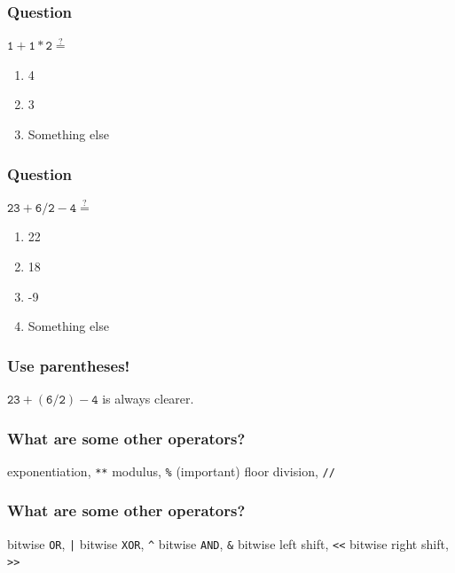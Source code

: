 \documentclass[11pt]{beamer}
\begin{document}
\begin{frame}
  \frametitle{Question}
  \Enlarge

  $\mathtt{1 + 1 * 2} \overset{?}{=}$
  \begin{enumerate}[label=\Alph*]
  \item  4
  \item  3
  \item  Something else
  \end{enumerate}
\end{frame}

\begin{frame}
  \frametitle{Question}
  \Enlarge

  $\mathtt{23 + 6 / 2 - 4} \overset{?}{=}$
  \begin{enumerate}[label=\Alph*]
  \item  22
  \item  18
  \item  -9
  \item  Something else
  \end{enumerate}
\end{frame}

\begin{frame}
  \frametitle{Use parentheses!}
  \Enlarge

  $\mathtt{23 + \left(6 / 2\right) - 4}$ is always clearer.
\end{frame}

\begin{frame}
  \frametitle{What are some other operators?}
  \Enlarge

  \begin{itemize}
  \myitem  exponentiation, \texttt{**} \pause
  \myitem  modulus, \texttt{\%}  (important) \pause
  \myitem  floor division, \texttt{//}
  \end{itemize}
\end{frame}

\begin{frame}
  \frametitle{What are some other operators?}
  \Enlarge

  \begin{itemize}
  \myitem  bitwise \texttt{OR}, \texttt{|}
  \myitem  bitwise \texttt{XOR}, \texttt{\^{}}
  \myitem  bitwise \texttt{AND}, \texttt{\&}
  \myitem  bitwise left shift, \texttt{<{}<}
  \myitem  bitwise right shift, \texttt{>{}>}
  \end{itemize}
\end{frame}
\end{document}
